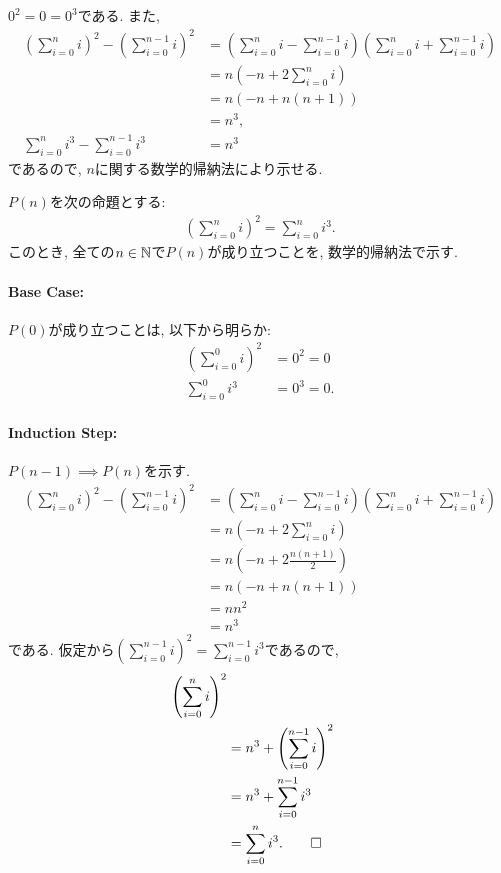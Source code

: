 \begin{proof**}
  $0^2=0=0^3$である.
  また,
  \begin{align*}
    \left(\sum_{i=0}^n i\right)^2-\left(\sum_{i=0}^{n-1} i\right)^2
    &=\left(\sum_{i=0}^n i-\sum_{i=0}^{n-1} i\right)\left(\sum_{i=0}^n i+\sum_{i=0}^{n-1} i\right)\\
    &=n\left(-n+2\sum_{i=0}^n i\right)\\
    &=n(-n+n(n+1))\\
    &=n^3,\\
    \sum_{i=0}^n i^3-\sum_{i=0}^{n-1} i^3
    &=n^3
    \end{align*}
  であるので,
  $n$に関する数学的帰納法により示せる.
\end{proof**}
\begin{proof*}
  $P(n)$を次の命題とする:
  \begin{align*}
    \left(\sum_{i=0}^n i\right)^2=\sum_{i=0}^n i^3.
  \end{align*}
  このとき,
  全ての$n\in\mathbb{N}$で$P(n)$が成り立つことを,
  数学的帰納法で示す.

  \paragraph{Base Case:}
  $P(0)$が成り立つことは, 以下から明らか:
  \begin{align*}
    \left(\sum_{i=0}^0 i\right)^2&=0^2=0\\
    \sum_{i=0}^{0}i^3&=0^3=0.
  \end{align*}

  \paragraph{Induction Step:}
  $P(n-1)\implies P(n)$を示す.
  \begin{align*}
    \left(\sum_{i=0}^n i\right)^2-\left(\sum_{i=0}^{n-1} i\right)^2
    &=\left(\sum_{i=0}^n i-\sum_{i=0}^{n-1} i\right)\left(\sum_{i=0}^n i+\sum_{i=0}^{n-1} i\right)\\
    &=n\left(-n+2\sum_{i=0}^n i\right)\\
    &=n(-n+2\frac{n(n+1)}{2})\\
    &=n(-n+n(n+1))\\
    &=nn^2\\
    &=n^3
  \end{align*}
  である.
  仮定から$\left(\sum_{i=0}^{n-1} i\right)^2=\sum_{i=0}^{n-1} i^3$であるので,
  \begin{align*}
    \left(\sum_{i=0}^{n} i\right)^2\\
    &=n^3+\left(\sum_{i=0}^{n-1} i\right)^2\\
    &=n^3+\sum_{i=0}^{n-1} i^3\\
    &=\sum_{i=0}^{n} i^3
    .\qedhere
  \end{align*}
\end{proof*}


